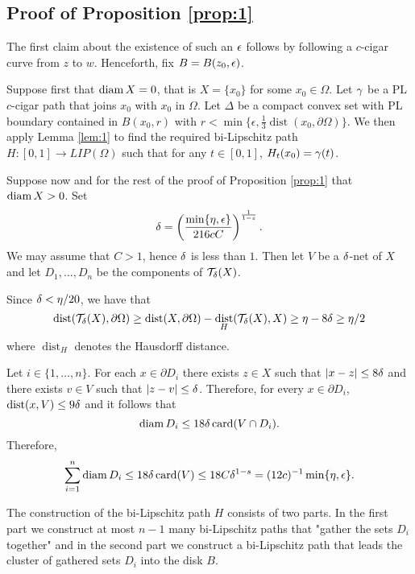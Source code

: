 \documentclass{amsart}
\DeclareMathOperator{\dist}{dist}
\DeclareMathOperator{\card}{card}
\begin{document}
\subsection{Proof of Proposition \ref{prop:1}}

The first claim about the existence of such an $\epsilon$ follows by following a $c$-cigar curve from $z$ to $w$. Henceforth, fix $B = B(z_0,\epsilon)$.

Suppose first that $\operatorname{diam}{X}=0$, that is $X=\{x_0\}$ for some $x_0\in \Omega$. Let $\gamma$ be a PL $c$-cigar path that joins $x_0$ with $x_0$ in $\Omega$. Let $\Delta$ be a compact convex set with PL boundary contained in $B(x_0,r)$ with $r < \min \{ \epsilon,  \tfrac13\dist(x_0,\partial\Omega) \}$. We then apply Lemma \ref{lem:1} to find the required bi-Lipschitz path $H:[0,1] \to LIP(\Omega)$ such that for any $t\in [0,1]$, $H_t(x_0) = \gamma(t)$.

Suppose now and for the rest of the proof of Proposition \ref{prop:1} that $\operatorname{diam}{X} > 0$.
Set 
\begin{equation}\label{eq:delta} 
\delta = \left(\frac{\min\{\eta,\epsilon\}}{216cC}\right)^{\frac1{1-s}}.
\end{equation}
We may assume that $C>1$, hence $\delta$ is less than $1$. Then let $V$ be a $\delta$-net of $X$ and let $D_1,\dots,D_n$ be the components of $\mathcal{T}_{\delta}(X)$. 

Since $\delta < \eta/20$, we have that 
\[ \dist(\mathcal{T}_{\d}(X),\partial\Omega) \geq \dist(X,\partial\Omega) - \dist_H(\mathcal{T}_{\d}(X),X) \geq \eta - 8\d \geq \eta/2\]
where $\dist_H$ denotes the Hausdorff distance.

Let $i\in\{1,\dots,n\}$. For each $x\in \partial D_i$ there exists $z\in X$ such that $|x-z|\leq 8\delta$ and there exists $v\in V$ such that $|z-v|\leq \delta$. Therefore, for every $x\in \partial D_i$, $\dist(x,V) \leq 9\d$ and it follows that
\begin{equation}\label{eq:3}
\diam{D_i} \leq 18\d\card(V\cap D_i).
\end{equation}
Therefore,
\begin{equation}\label{eq:1}
\sum_{i=1}^n\diam{D_i} \leq  18\d\card(V) \leq 18C\d^{1-s} = (12c)^{-1}\min\{\eta,\e\}.
\end{equation}

The construction of the bi-Lipschitz path $H$ consists of two parts. In the first part we construct at most $n-1$ many bi-Lipschitz paths that "gather the sets $D_i$ together" and in the second part we construct a bi-Lipschitz path that leads the cluster of gathered sets $D_i$ into the disk $B$.
\end{document}
